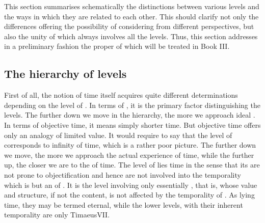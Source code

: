 This section summarises schematically the distinctions between various levels
and the ways in which they are related to each other.  This should clarify not
only the differences offering  the possibility of considering
 from different perspectives, but also the unity of  which always involves all the levels. Thus, this section addresses
in a preliminary fashion the proper  of  which will be
treated in Book III.

\subsection{The hierarchy of levels}



\pa
First of all, the notion of time itself
acquires quite different determinations depending on the level of
.
In terms of , it is the primary factor distinguishing the levels.
The further down we move in the hierarchy, the more we approach
ideal .  In terms of objective time, it means simply
shorter time.  But objective time offers only an analogy of limited value.  It
would require to say that the level of  corresponds to infinity
of time, which is a rather poor picture. The further down we move, the more we
approach the actual experience of  time, while the further up, the
closer we are to the  of time.  The level of  lies
 time in the sense that its  are not prone to
{objectification} and hence are not involved into the temporality which is
but an  of .  It is the level involving only essentially
 , that is,  whose value and
structure, if not the content, is not affected by the temporality of
. As lying 
 time, they may be termed eternal, while the lower levels, with their
inherent temporality are only \citet{moving image of eternity.}{Timaeus}{VII}. 

